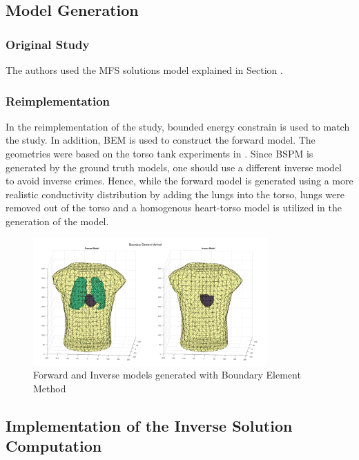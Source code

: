 \documentclass[draftcls, onecolumn, journal]{IEEEtran}
\begin{document}
\subsection{Model Generation} \label{subsec:modelgeneration}

\subsubsection{Original Study}

The authors used the MFS solutions model explained in Section .

\subsubsection{Reimplementation}\label{subsec:modelreimplement}

In the reimplementation of the study, bounded energy constrain is used to match the study. In addition, BEM is used to construct the forward model. The geometries were based on the torso tank experiments in \cite{macleod1995electrocardiographic}. Since BSPM is generated by the ground truth models, one should use a different inverse model to avoid inverse crimes. Hence, while the forward model is generated using a more realistic conductivity distribution by adding the lungs into the torso, lungs were removed out of the torso and a homogenous heart-torso model is utilized in the generation of the model. 

\begin{figure}[h!]
    \centering
    \includegraphics[width=0.8\textwidth]{../images/BEM.png}
    \caption{Forward and Inverse models generated with Boundary Element Method}\label{fig:mylabel}
\end{figure}
    
\newpage

\subsection{Implementation of the Inverse Solution Computation}
\end{document}
